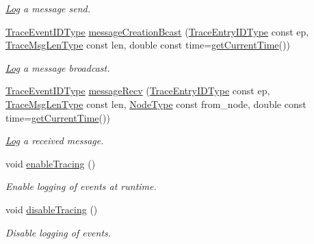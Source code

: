 \begin{DoxyCompactItemize}
\begin{DoxyCompactList}\small\item\em \hyperlink{structvt_1_1trace_1_1_log}{Log} a message send. \end{DoxyCompactList}\item 
\hyperlink{namespacevt_1_1trace_a64a7185f3e102df8d8258f263ccd1582}{Trace\+Event\+I\+D\+Type} \hyperlink{structvt_1_1trace_1_1_trace_ad034b14649101fb530eccfb4e2b958ce}{message\+Creation\+Bcast} (\hyperlink{namespacevt_1_1trace_a3c14050715ba9eceaeff51fb3de64f2f}{Trace\+Entry\+I\+D\+Type} const ep, \hyperlink{namespacevt_1_1trace_aeb598f45d67d41db7902e494f2f0ce59}{Trace\+Msg\+Len\+Type} const len, double const time=\hyperlink{structvt_1_1trace_1_1_trace_a04cf6b76b4ced1bc90d246a34c948db5}{get\+Current\+Time}())
\begin{DoxyCompactList}\small\item\em \hyperlink{structvt_1_1trace_1_1_log}{Log} a message broadcast. \end{DoxyCompactList}\item 
\hyperlink{namespacevt_1_1trace_a64a7185f3e102df8d8258f263ccd1582}{Trace\+Event\+I\+D\+Type} \hyperlink{structvt_1_1trace_1_1_trace_aa14d58fb03a226e213f72bb03a13bb9f}{message\+Recv} (\hyperlink{namespacevt_1_1trace_a3c14050715ba9eceaeff51fb3de64f2f}{Trace\+Entry\+I\+D\+Type} const ep, \hyperlink{namespacevt_1_1trace_aeb598f45d67d41db7902e494f2f0ce59}{Trace\+Msg\+Len\+Type} const len, \hyperlink{namespacevt_a866da9d0efc19c0a1ce79e9e492f47e2}{Node\+Type} const from\+\_\+node, double const time=\hyperlink{structvt_1_1trace_1_1_trace_a04cf6b76b4ced1bc90d246a34c948db5}{get\+Current\+Time}())
\begin{DoxyCompactList}\small\item\em \hyperlink{structvt_1_1trace_1_1_log}{Log} a received message. \end{DoxyCompactList}\item 
void \hyperlink{structvt_1_1trace_1_1_trace_ae7ef14764ce87e0ea8baf802db400066}{enable\+Tracing} ()
\begin{DoxyCompactList}\small\item\em Enable logging of events at runtime. \end{DoxyCompactList}\item 
void \hyperlink{structvt_1_1trace_1_1_trace_a54f34dbcf8960de7b319e44ef9b76eb0}{disable\+Tracing} ()
\begin{DoxyCompactList}\small\item\em Disable logging of events. \end{DoxyCompactList}\item 

\end{DoxyCompactItemize}
